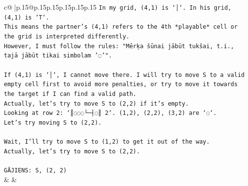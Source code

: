 \documentclass{article}
\begin{document}
{\begin{supertabular}{c@{$\;$}|p{.15\linewidth}@{}p{.15\linewidth}p{.15\linewidth}p{.15\linewidth}p{.15\linewidth}p{.15\linewidth}}
{{{\texttt{In my grid, (4,1) is `│`. In his grid, (4,1) is `T`.} \\
\texttt{This means the partner's (4,1) refers to the 4th *playable* cell or the grid is interpreted differently.} \\
\texttt{However, I must follow the rules: "Mērķa šūnai jābūt tukšai, t.i., tajā jābūt tikai simbolam '◌'".} \\
\\ 
\texttt{If (4,1) is `│`, I cannot move there. I will try to move S to a valid empty cell first to avoid more penalties, or try to move it towards the target if I can find a valid path.} \\
\texttt{Actually, let's try to move S to (2,2) if it's empty.} \\
\texttt{Looking at row 2: `║◌◌◌└─┤◌║ 2`. (1,2), (2,2), (3,2) are `◌`.} \\
\texttt{Let's try moving S to (2,2).} \\
\\ 
\texttt{Wait, I'll try to move S to (1,2) to get it out of the way.} \\
\texttt{Actually, let's try to move S to (2,2).} \\
\\ 
\texttt{GĀJIENS: S, (2, 2)} \\
            }
        }
    }
    & & \\ \\


\end{supertabular}}
\end{document}
